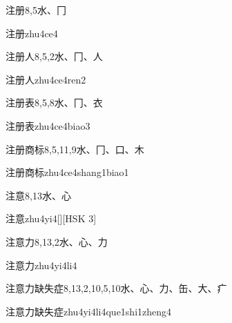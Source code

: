 \begin{entry}{注册}{8,5}{⽔、⼌}
  \begin{phonetics}{注册}{zhu4ce4}
  \end{phonetics}
\end{entry}

\begin{entry}{注册人}{8,5,2}{⽔、⼌、⼈}
  \begin{phonetics}{注册人}{zhu4ce4ren2}
  \end{phonetics}
\end{entry}

\begin{entry}{注册表}{8,5,8}{⽔、⼌、⾐}
  \begin{phonetics}{注册表}{zhu4ce4biao3}
  \end{phonetics}
\end{entry}

\begin{entry}{注册商标}{8,5,11,9}{⽔、⼌、⼝、⽊}
  \begin{phonetics}{注册商标}{zhu4ce4shang1biao1}
  \end{phonetics}
\end{entry}

\begin{entry}{注意}{8,13}{⽔、⼼}
  \begin{phonetics}{注意}{zhu4yi4}[][HSK 3]
  \end{phonetics}
\end{entry}

\begin{entry}{注意力}{8,13,2}{⽔、⼼、⼒}
  \begin{phonetics}{注意力}{zhu4yi4li4}
  \end{phonetics}
\end{entry}

\begin{entry}{注意力缺失症}{8,13,2,10,5,10}{⽔、⼼、⼒、⽸、⼤、⽧}
  \begin{phonetics}{注意力缺失症}{zhu4yi4li4que1shi1zheng4}
  \end{phonetics}
\end{entry}

